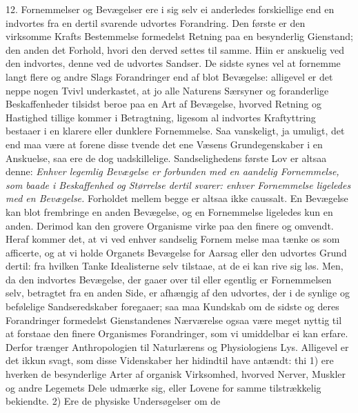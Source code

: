 \documentclass[12pt,a4paper]{article}
\newcommand{\opage}[1]{\marginnote{\footnotesize\textit{[#1]}}}
\begin{document}
\opage{79} 12. Fornemmelser og Bevægelser ere i sig selv ei anderledes forskiellige end en
indvortes fra en dertil svarende udvortes Forandring. Den første er den virksomme
Krafts Bestemmelse formedelst Retning paa en besynderlig Gienstand; den anden det
Forhold, hvori den derved settes til samme. Hiin er anskuelig ved den indvortes, denne
ved de udvortes Sandser. De sidste synes vel at fornemme langt flere og andre Slags
Forandringer end af blot Bevægelse: alligevel er det neppe nogen Tvivl underkastet, at
jo alle Naturens Særsyner og foranderlige Beskaffenheder tilsidst beroe paa en Art af
Bevægelse, hvorved Retning og Hastighed tillige kommer i Betragtning, ligesom al
indvortes Kraftyttring bestaaer i en klarere eller dunklere Fornemmelse. Saa vanskeligt,
ja umuligt, det end maa være at forene disse tvende det ene Væsens Grundegenskaber i en
Anskuelse, saa ere de dog uadskillelige. Sandselighedens første Lov er altsaa denne:
\emph{Enhver legemlig Bevægelse er forbunden med en aandelig Fornemmelse, som baade i
Beskaffenhed og Størrelse dertil svarer: enhver Fornemmelse ligeledes med en Bevægelse.}
Forholdet mellem begge er altsaa ikke caussalt. En Bevægelse kan blot frembringe en
anden Bevægelse, og en Fornemmelse ligeledes kun en anden. Derimod kan den grovere
Organisme virke paa den finere og omvendt. Heraf kommer det, at vi ved enhver sandselig
Fornem%
\opage{80}melse maa tænke os som afficerte, og at vi holde Organets Bevægelse for Aarsag eller
den udvortes Grund dertil: fra hvilken Tanke Idealisterne selv tilstaae, at de ei kan
rive sig løs. Men, da den indvortes Bevægelse, der gaaer over til eller egentlig er
Fornemmelsen selv, betragtet fra en anden Side, er afhængig af den udvortes, der i de
synlige og befølelige Sandseredskaber foregaaer; saa maa Kundskab om de sidste og deres
Forandringer formedelst Gienstandenes Nærværelse ogsaa være meget nyttig til at forstaae
den finere Organismes Forandringer, som vi umiddelbar ei kan erfare. Derfor trænger
Anthropologien til Naturlærens og Physiologiens Lys. Alligevel er det ikkun svagt, som
disse Videnskaber her hidindtil have antændt: thi 1) ere hverken de besynderlige Arter
af organisk Virksomhed, hvorved Nerver, Muskler og andre Legemets Dele udmærke sig,
eller Lovene for samme tilstrækkelig bekiendte. 2) Ere de physiske Undersøgelser om de
\end{document}
